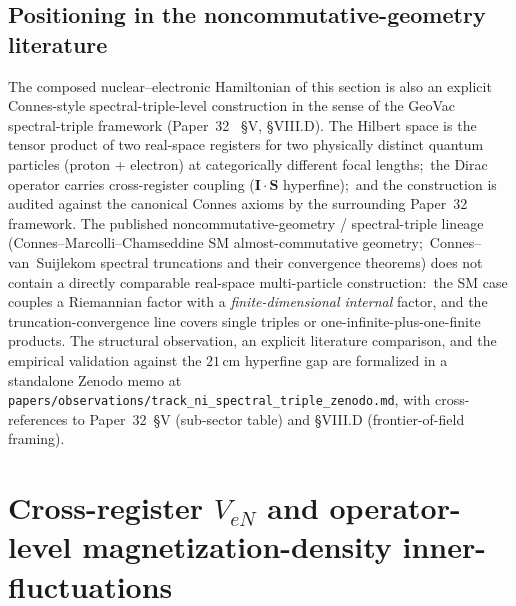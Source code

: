 \documentclass[twocolumn,prc,amsmath,amssymb,superscriptaddress]{revtex4-2}
\begin{document}
\subsection{Positioning in the noncommutative-geometry literature}

The composed nuclear--electronic Hamiltonian of this section is also
an explicit Connes-style spectral-triple-level construction in the
sense of the GeoVac spectral-triple framework (Paper~32~\cite{Paper32}
\S V, \S VIII.D). The Hilbert space is the tensor product of two
real-space registers for two physically distinct quantum particles
(proton + electron) at categorically different focal lengths;\ the
Dirac operator carries cross-register coupling
($\mathbf{I}\cdot\mathbf{S}$ hyperfine);\ and the construction is
audited against the canonical Connes axioms by the surrounding
Paper~32 framework. The published noncommutative-geometry /
spectral-triple lineage (Connes--Marcolli--Chamseddine SM
almost-commutative geometry;\ Connes--van~Suijlekom spectral
truncations and their convergence theorems) does not contain a
directly comparable real-space multi-particle construction:\ the SM
case couples a Riemannian factor with a \emph{finite-dimensional
internal} factor, and the truncation-convergence line covers single
triples or one-infinite-plus-one-finite products. The structural
observation, an explicit literature comparison, and the empirical
validation against the $21\,$cm hyperfine gap are formalized in a
standalone Zenodo memo at
\texttt{papers/observations/track\_ni\_spectral\_triple\_zenodo.md},
with cross-references to Paper~32~\S V (sub-sector table) and
\S VIII.D (frontier-of-field framing).

\section{Cross-register $V_{eN}$ and operator-level magnetization-density
inner-fluctuations}
\label{sec:cross-register}
\end{document}
